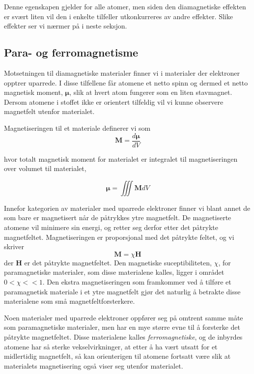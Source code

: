 \documentclass[a4paper,11pt, twocolumn]{article}
\begin{document}
Denne egenskapen gjelder for alle atomer, men siden den diamagnetiske effekten er svært liten vil den i enkelte tilfeller utkonkurreres av andre effekter. Slike effekter ser vi nærmer på i neste seksjon.

\subsection{Para- og ferromagnetisme}
Motsetningen til diamagnetiske materialer finner vi i materialer der elektroner opptrer uparrede. I disse tilfellene får atomene et netto spinn og dermed et netto magnetisk moment, ${\boldsymbol \mu}$, slik at hvert atom fungerer som en liten stavmagnet. Dersom atomene i stoffet ikke er orientert tilfeldig vil vi kunne observere magnetfelt utenfor materialet.

Magnetiseringen til et materiale definerer vi som
\begin{equation}
	\mathbf{M} = \frac{d {\boldsymbol \mu}}{dV}
	\label{eq:magnetization}
\end{equation}

hvor totalt magnetisk moment for materialet er integralet til magnetiseringen over volumet til materialet,

\begin{equation}
	{\boldsymbol \mu} = \iiint \mathbf{M}dV
	\label{eq:totalMoment}
\end{equation}

Innefor kategorien av materialer med uparrede elektroner finner vi blant annet de som bare er magnetisert når de påtrykkes ytre magnetfelt. De magnetiserte atomene vil minimere sin energi, og retter seg derfor etter det påtrykte magnetfeltet. Magnetiseringen er proporsjonal med det påtrykte feltet, og vi skriver 
\begin{equation}
	\mathbf{M} = \chi\mathbf{H}
	\label{eq:proposjonalitetPara}
\end{equation}
der $\mathbf{H}$ er det påtrykte magnetfeltet. Den magnetiske suceptibiliteten, $\chi$, for paramagnetiske materialer, som disse materialene kalles, ligger i området $0<\chi<<1$. Den ekstra magnetiseringen som framkommer ved å tilføre et paramagnetisk materiale i et ytre magnetfelt gjør det naturlig å betrakte disse materialene som små magnetfeltforsterkere.

Noen materialer med uparrede elektroner oppfører seg på omtrent samme måte som paramagnetiske materialer, men har en mye større evne til å forsterke det påtrykte magnetfeltet. Disse materialene kalles \textit{ferromagnetiske}, og de inbyrdes atomene har så sterke vekselvirkninger, at etter å ha vært utsatt for et midlertidig magnetfelt, så kan orienterigen til atomene fortsatt være slik at materialets magnetisering også viser seg utenfor materialet. 
\end{document}
